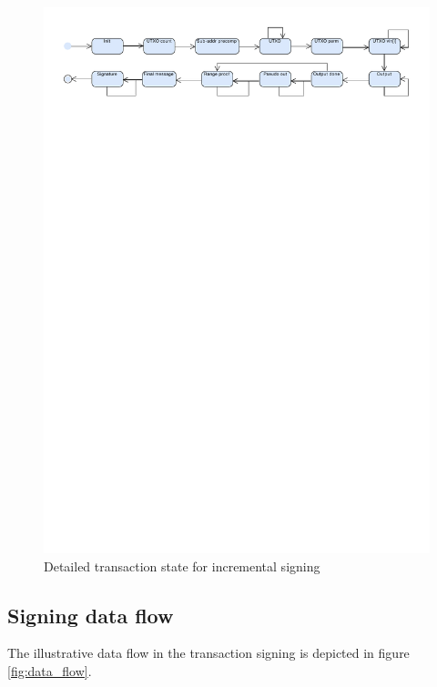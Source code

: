 \documentclass[]{article}
\begin{document}
\begin{figure}[H]
	\centering
	\includegraphics[width=1.\textwidth,trim={0 24cm 0 1cm},clip, angle=0]{tsx_state_detail.pdf}
	\caption{Detailed transaction state for incremental signing} \label{fig:detailed_state}
\end{figure}

\subsection{Signing data flow}
The illustrative data flow in the transaction signing is depicted in figure \ref{fig:data_flow}.
\end{document}
